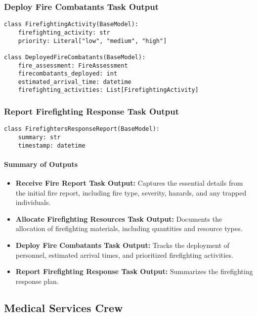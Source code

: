 \subsubsection{Deploy Fire Combatants Task Output}
\begin{lstlisting}[caption={Pydantic model for Deploy Fire Combatants Task Output}]
class FirefightingActivity(BaseModel):
    firefighting_activity: str
    priority: Literal["low", "medium", "high"]

class DeployedFireCombatants(BaseModel):
    fire_assessment: FireAssessment
    firecombatants_deployed: int
    estimated_arrival_time: datetime
    firefighting_activities: List[FirefightingActivity]
\end{lstlisting}


\subsubsection{Report Firefighting Response Task Output}
\begin{lstlisting}[caption={Pydantic model for Report Firefighting Response Task Output}]
class FirefightersResponseReport(BaseModel):
    summary: str
    timestamp: datetime
\end{lstlisting}

\paragraph{Summary of Outputs}
\begin{itemize}
\item \textbf{Receive Fire Report Task Output:} Captures the essential details from the initial fire report, including fire type, severity, hazards, and any trapped individuals.
\item \textbf{Allocate Firefighting Resources Task Output:} Documents the allocation of firefighting materials, including quantities and resource types.
\item \textbf{Deploy Fire Combatants Task Output:} Tracks the deployment of personnel, estimated arrival times, and prioritized firefighting activities.
\item \textbf{Report Firefighting Response Task Output:} Summarizes the firefighting response plan.
\end{itemize}

\subsection{Medical Services Crew}

